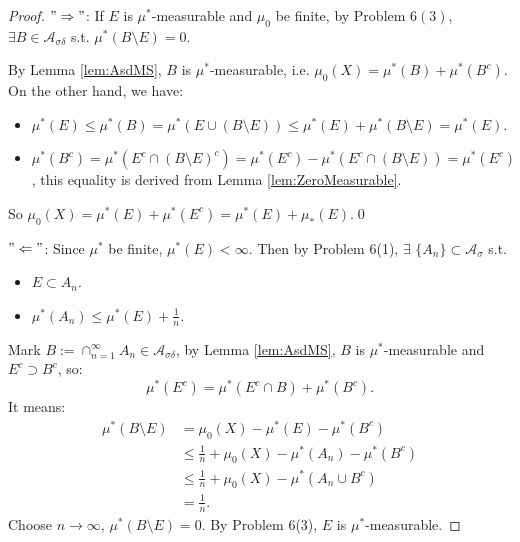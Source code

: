 \documentclass{article}
\begin{document}
\begin{proof}
    $"\Rightarrow"$: If $E$ is $\mu^{*}$-measurable 
    and $\mu_0$ be finite, 
    by Problem 6$(3)$, $\exists B\in\mathcal{A}_{\sigma\delta}$ 
    s.t. $\mu^{*}(B\setminus E)=0$.

    By Lemma \ref{lem:AsdMS}, $B$ is $\mu^{*}$-measurable, i.e. 
    $\mu_{0}(X)=\mu^{*}(B)+\mu^{*}(B^{c})$. 
    On the other hand, we have:
    \begin{itemize}
        \item $\mu^{*}(E)\le\mu^{*}(B)=\mu^{*}(E\cup(B\setminus E))
        \le\mu^{*}(E)+\mu^{*}(B\setminus E)=\mu^{*}(E)$.
        \item $\mu^{*}(B^{c})=\mu^{*}(E^{c}\cap(B\setminus E)^{c})
        =\mu^{*}(E^{c})-\mu^{*}(E^{c}\cap(B\setminus E))
        =\mu^{*}(E^{c})$,
        this equality is derived from Lemma \ref{lem:ZeroMeasurable}.
    \end{itemize}
    So $\mu_{0}(X)=\mu^{*}(E)+\mu^{*}(E^{c})=\mu^{*}(E)+\mu_{*}(E)$.\qed

    $"\Leftarrow"$: Since $\mu^{*}$ be finite, $\mu^{*}(E)<\infty$. 
    Then by Problem 6(1), 
    $\exists$ $\{A_{n}\}\subset\mathcal{A}_{\sigma}$ s.t. 
    \begin{itemize}
        \item $E\subset A_{n}$.
        \item $\mu^{*}(A_{n})\le\mu^{*}(E)+\frac{1}{n}$.
    \end{itemize}
    Mark $B:=\cap_{n=1}^{\infty}A_{n}\in\mathcal{A}_{\sigma\delta}$, 
    by Lemma \ref{lem:AsdMS}, $B$ is $\mu^{*}$-measurable 
    and $E^{c}\supset B^{c}$, so:
    \begin{displaymath}
        \mu^{*}(E^{c})=\mu^{*}(E^{c}\cap B)+\mu^{*}(B^{c}).
    \end{displaymath}
    It means:
    \begin{displaymath}
        \begin{aligned}
            \mu^{*}(B\setminus E)&=\mu_{0}(X)-\mu^{*}(E)-\mu^{*}(B^{c})\\
            &\le\frac{1}{n}+\mu_{0}(X)-\mu^{*}(A_{n})-\mu^{*}(B^{c})\\
            &\le\frac{1}{n}+\mu_{0}(X)-\mu^{*}(A_{n}\cup B^{c})\\
            &=\frac{1}{n}.
        \end{aligned}
    \end{displaymath}
    Choose $n\rightarrow\infty$, $\mu^{*}(B\setminus E)=0$. 
    By Problem 6(3), $E$ is $\mu^{*}$-measurable.
\end{proof}
\end{document}
